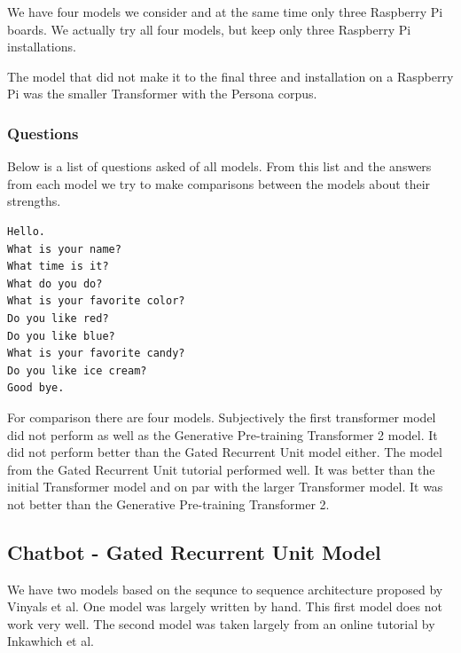 
We have four models we consider and at the same time only three Raspberry Pi boards. We actually try all four models, but keep only three Raspberry Pi installations. 


The model that did not make it to the final three and installation on a Raspberry Pi was the smaller Transformer with the Persona corpus.

\subsubsection*{Questions}
Below is a list of questions asked of all models. From this list and the answers from each model we try to make comparisons between the models about their strengths.

\begin{verbatim}
Hello.
What is your name? 
What time is it?
What do you do?
What is your favorite color?
Do you like red?
Do you like blue?
What is your favorite candy?
Do you like ice cream?
Good bye.
\end{verbatim}

For comparison there are four models. Subjectively the first transformer model did not perform as well as the Generative Pre-training Transformer 2 model. It did not perform better than the Gated Recurrent Unit model either. The model from the Gated Recurrent Unit tutorial performed well. It was better than the initial Transformer model and on par with the larger Transformer model. It was not better than the Generative Pre-training Transformer 2.


\subsection{Chatbot - Gated Recurrent Unit Model}
We have two models based on the sequnce to sequence architecture proposed by Vinyals et al\cite{DBLP:journals/corr/VinyalsL15}. One model was largely written by hand. This first model does not work very well. The second model was taken largely from an online tutorial by  Inkawhich et al\cite{2018Inkawhich}.

